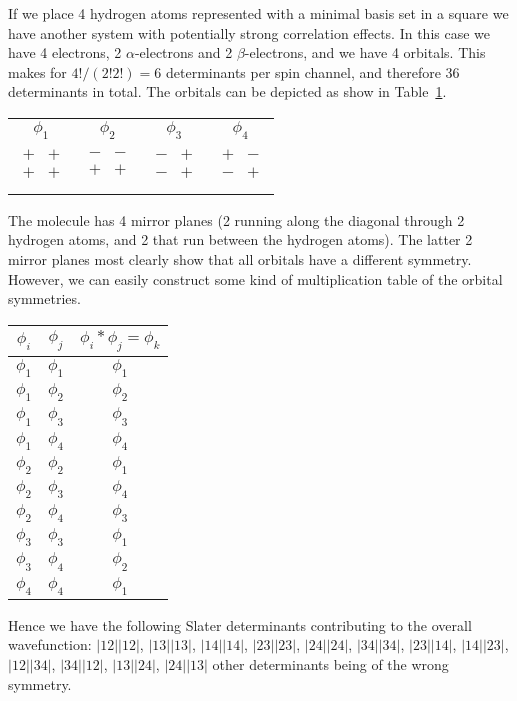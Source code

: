 \documentclass[pra]{revtex4-1}
\begin{document}
If we place 4 hydrogen atoms represented with a minimal basis set in a square
we have another system with potentially strong correlation effects. In this case
we have 4 electrons, 2 $\alpha$-electrons and 2 $\beta$-electrons, and we have 4
orbitals. This makes for $4!/(2!2!)=6$ determinants per spin channel, and therefore
36 determinants in total. The orbitals can be depicted as show in Table~\ref{table:h4}.
\begin{table}
\begin{tabular}{cccc}
$\phi_1$ & $\phi_2$ & $\phi_3$ & $\phi_4$ \\
$\begin{array}{cc}
 + & + \\
 + & + \\
\end{array}$
&
$\begin{array}{cc}
 - & - \\
 + & + \\
\end{array}$
&
$\begin{array}{cc}
 - & + \\
 - & + \\
\end{array}$
&
$\begin{array}{cc}
 + & - \\
 - & + \\
\end{array}$
\end{tabular}
\label{table:h4}
\end{table}
The molecule has 4 mirror planes (2 running along the diagonal through 2 hydrogen atoms, and 2 
that run between the hydrogen atoms). The latter 2 mirror planes most clearly show that all
orbitals have a different symmetry. However, we can easily construct some kind of multiplication
table of the orbital symmetries.
\begin{table}
\begin{tabular}{cc|c}
\hline
$\phi_i$ & $\phi_j$ & $\phi_i*\phi_j=\phi_k$ \\
\hline
$\phi_1$ & $\phi_1$ & $\phi_1$ \\
$\phi_1$ & $\phi_2$ & $\phi_2$ \\
$\phi_1$ & $\phi_3$ & $\phi_3$ \\
$\phi_1$ & $\phi_4$ & $\phi_4$ \\
$\phi_2$ & $\phi_2$ & $\phi_1$ \\
$\phi_2$ & $\phi_3$ & $\phi_4$ \\
$\phi_2$ & $\phi_4$ & $\phi_3$ \\
$\phi_3$ & $\phi_3$ & $\phi_1$ \\
$\phi_3$ & $\phi_4$ & $\phi_2$ \\
$\phi_4$ & $\phi_4$ & $\phi_1$ \\
\hline
\end{tabular}
\end{table}
Hence we have the following Slater determinants 
contributing to the overall wavefunction:
$|12||12|$, $|13||13|$, $|14||14|$, $|23||23|$, $|24||24|$, $|34||34|$,
$|23||14|$, $|14||23|$, $|12||34|$, $|34||12|$, $|13||24|$, $|24||13|$
other determinants being of the wrong symmetry.




\end{document}
